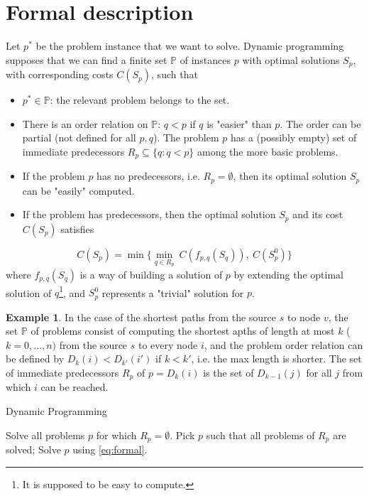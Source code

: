 \documentclass[11pt, openany]{report}
\theoremstyle{definition}
\newtheorem{ex}[thm]{Example}
\begin{document}
\section{Formal description}
Let $p^*$ be the problem instance that we want to solve. Dynamic programming supposes that we can find a finite set $\mathbb{P}$ of instances $p$ with optimal solutions $S_p$, with corresponding costs $C(S_p)$, such that 
\begin{itemize}
    \item $p^*\in \mathbb{P}$: the relevant problem belongs to the set.
    \item There is an order relation on $\mathbb{P}$: $q<p$ if $q$ is "easier" than $p$. The order can be partial (not defined for all $p,q$). The problem $p$ has a (possibly empty) set of immediate predecessors $R_p\subseteq \{q:q<p\}$ among the more basic problems.
    \item If the problem $p$ has no predecessors, i.e. $R_p=\emptyset$, then its optimal solution $S_p$ can be "easily" computed. 
    \item If the problem has predecessors, then the optimal solution $S_p$ and its cost $C(S_p)$ satisfies
\end{itemize}
\begin{equation}\label{eq:formal}
    C(S_p)=\min\{\min_{q\in R_p}\:C(f_{p,q}(S_q)),\:C(S_p^0)\}
\end{equation}
where $f_{p,q}(S_q)$ is a way of building a solution of $p$ by extending the optimal solution of $q$\footnote{It is supposed to be easy to compute.}, and $S_p^0$ represents a "trivial" solution for $p$. 
\begin{ex}
    In the case of the shortest paths from the source $s$ to node $v$, the set $\mathbb{P}$ of problems consist of computing the shortest apths of length at most $k$ ($k=0,\dots,n)$ from the source $s$ to every node $i$, and the problem order relation can be defined by $D_k(i)<D_{k'}(i')$ if $k<k'$, i.e. the max length is shorter. The set of immediate predecessors $R_p$ of $p=D_k(i)$ is the set of $D_{k-1}(j)$ for all $j$ from which $i$ can be reached. 
\end{ex}
\begin{algorithm}
    \caption{Dynamic Programming}\label{algo:dp}
    \begin{algorithmic}[1]
        \State Solve all problems $p$ for which $R_p=\emptyset$.
            \State Pick $p$ such that all problems of $R_p$ are solved;
            \State Solve $p$ using \eqref{eq:formal}.
        \EndWhile
    \end{algorithmic}
\end{algorithm}
\end{document}
